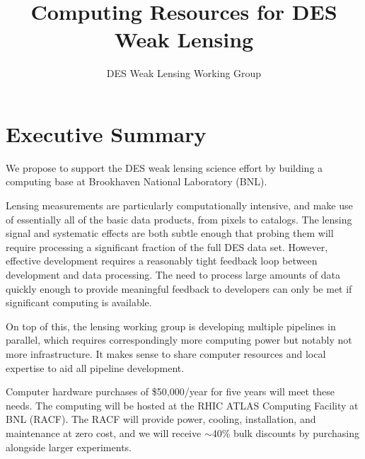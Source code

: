 \documentclass[12pt]{article}
\begin{document}
\title{Computing Resources for DES Weak Lensing}
\author{DES Weak Lensing Working Group}

\date{}
\maketitle


\section{Executive Summary}

We propose to support the DES weak lensing science effort by building a
computing base at Brookhaven National Laboratory (BNL).  

Lensing measurements are particularly computationally intensive, and make use
of essentially all of the basic data products, from pixels to catalogs.  The
lensing signal and systematic effects are both subtle enough that probing them
will require processing a significant fraction of the full DES data set.
However, effective development requires a reasonably tight feedback loop
between development and data processing.  The need to process large amounts
of data quickly enough to provide meaningful feedback to developers 
can only be met if significant computing is available.

On top of this, the lensing working group is developing multiple pipelines in
parallel, which requires correspondingly more computing power but notably not
more infrastructure.  It makes sense to share computer resources and local
expertise to aid all pipeline development.

Computer hardware purchases of \$50,000/year for five years will meet these
needs.  The computing will be hosted at the RHIC ATLAS Computing Facility at
BNL (RACF).  The RACF will provide power, cooling, installation, and
maintenance at zero cost, and we will receive $\sim$40\% bulk discounts by
purchasing alongside larger experiments.
\end{document}
